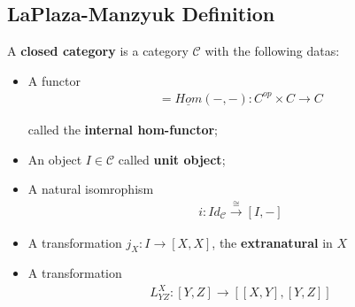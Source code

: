 \documentclass[Total.tex]{subfiles}
\begin{document}
			\subsection{LaPlaza-Manzyuk Definition}
			\begin{Def}
				A \textbf{closed category} is a category $\mathcal{C}$ with the following datas:
				\begin{itemize}
					\item A functor
					\begin{gather*}
						[-,-]=\underline{Hom}(-,-):C^{op}\times C\rightarrow C
					\end{gather*}
					
					called the \textbf{internal hom-functor};
					\item An object $I\in \mathcal{C}$ called \textbf{unit object};
					\item A natural isomrophism
					\begin{gather*}
						i:Id_\mathcal{C}\stackrel{\cong}{\rightarrow} [I,-]
					\end{gather*}
					\item A transformation $j_X:I\rightarrow [X,X]$, the \textbf{extranatural} in $X$
					\item A transformation 
					\begin{gather*}
						L_{YZ}^X:[Y,Z]\rightarrow [[X,Y],[Y,Z]]
					\end{gather*}
				\end{itemize}
				

\end{Def}
\end{document}
